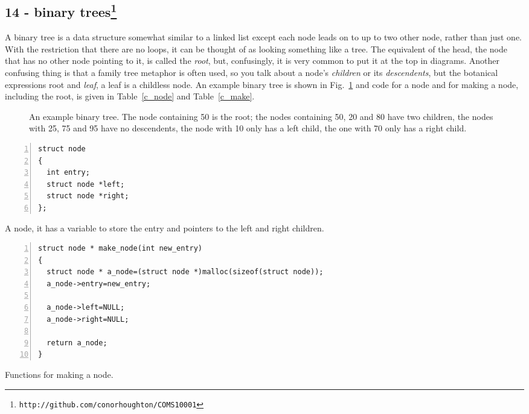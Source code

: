 \documentclass[11pt,a4paper]{scrartcl}
\begin{document}
\subsection*{14 - binary trees\footnote{\texttt{http://github.com/conorhoughton/COMS10001}}}

A binary tree is a data structure somewhat similar to a linked list
except each node leads on to up to two other node, rather than just
one. With the restriction that there are no loops, it can be thought
of as looking something like a tree. The equivalent of the head, the
node that has no other node pointing to it, is called the {\sl root},
but, confusingly, it is very common to put it at the top in
diagrams. Another confusing thing is that a family tree metaphor is
often used, so you talk about a node's {\sl children} or its {\sl
  descendents}, but the botanical expressions root and {\sl leaf}, a
leaf is a childless node. An example binary tree is shown in
Fig.~\ref{fig_example_tree} and code for a node and for making a node,
including the root, is given in Table~\ref{c_node} and
Table~\ref{c_make}.

\begin{figure}
\begin{center}
\end{center}
\caption{An example binary tree. The node containing 50 is the root; the nodes containing 50, 20 and 80 have two children, the nodes with 25, 75 and 95 have no descendents, the node with 10 only has a left child, the one with 70 only has a right child.\label{fig_example_tree}}
\end{figure}


\begin{table}
\begin{lstlisting}[numbers=left]
struct node
{
  int entry;
  struct node *left;
  struct node *right;
};
\end{lstlisting}
\caption{A node, it has a variable to store the entry and pointers to the left and right children. \label{c_node}}
\end{table}


\begin{table}
\begin{lstlisting}[numbers=left]
struct node * make_node(int new_entry)
{
  struct node * a_node=(struct node *)malloc(sizeof(struct node));
  a_node->entry=new_entry;

  a_node->left=NULL;
  a_node->right=NULL;

  return a_node;
}
\end{lstlisting}
\caption{Functions for making a node. \label{c_make}}
\end{table}
\end{document}
